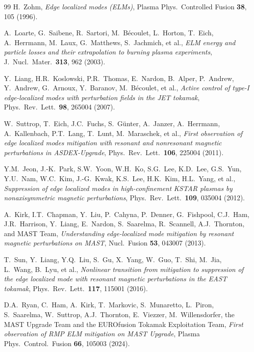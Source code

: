 \documentclass[12pt,prb,aps]{revtex4-1}
\begin{document}
\begin{thebibliography}{99}
 H.~Zohm, {\em Edge localized modes (ELMs)}, Plasma Phys.\ Controlled Fusion {\bf 38}, 105 (1996).

 A.~Loarte, G.~Saibene, R.~Sartori, M.~B\'{e}coulet, L.~Horton, T.~Eich, 
A.~Herrmann, M.~Laux, G.~Matthews, S.~Jachmich, et al., {\em ELM energy and particle losses and their extrapolation to burning plasma experiments}, J.\ Nucl.\ Mater.\ {\bf 313}, 962 (2003).

 Y.~Liang, H.R.~Koslowski, P.R.~Thomas, E.~Nardon, B.~Alper, P.~Andrew, 
Y.~Andrew, G.~Arnoux, Y.~Baranov, M.~B\'{e}coulet, et al., {\em Active control of type-I edge-localized modes with perturbation fields in the JET  tokamak}, Phys.\ Rev.\ Lett.\ {\bf 98}, 265004 (2007).

 W.~Suttrop, T.~Eich, J.C.~Fuchs, S.~G\"{u}nter, A.~Janzer, A.~Herrmann, 
A.~Kallenbach, P.T.~Lang, T.~Lunt, M.~Maraschek,  et al., {\em First observation of edge localized modes mitigation with resonant and nonresonant magnetic perturbations in ASDEX-Upgrade}, Phys.\ Rev.\ Lett.\ {\bf 106}, 225004 (2011).

 Y.M.~Jeon, J.-K.~Park, S.W.~Yoon, W.H.~Ko, S.G.~Lee, K.D.~Lee, G.S.~Yun,
Y.U.~Nam, W.C.~Kim, J.-G.~Kwak, K.S.~Lee, H.K.~Kim, H.L.~Yang,  et al., {\em Suppression of edge localized modes in high-confinement KSTAR plasmas by nonaxisymmetric magnetic perturbations}, 
Phys.\ Rev.\ Lett.\ {\bf 109}, 035004 (2012).

 A.~Kirk, I.T.~Chapman, Y.~Liu, P.~Cahyna, P.~Denner, G.~Fishpool, C.J.~Ham,
J.R.~Harrison, Y.~Liang, E.~Nardon, S.~Saarelma, R.~Scannell, A.J.~Thornton,
and MAST Team, {\em Understanding edge-localized mode mitigation by resonant magnetic perturbations on MAST}, Nucl.\ Fusion {\bf 53}, 043007 (2013).

 T.~Sun, Y.~Liang, Y.Q.~Liu, S.~Gu, X.~Yang, W.~Guo, T.~Shi, M.~Jia, L.~Wang, 
B.~Lyu, et al., {\em Nonlinear transition from mitigation to suppression of the edge localized mode with resonant magnetic perturbations in the EAST tokamak}, Phys.\ Rev.\ Lett.\ {\bf 117}, 115001 (2016).

 D.A.~Ryan, C.~Ham, A.~Kirk, T.~Markovic, S.~Munaretto, L.~Piron, S.~Saarelma, W.~Suttrop, A.J.~Thornton, E.~Viezzer, M.~Willensdorfer, the MAST Upgrade Team and the EUROfusion Tokamak Exploitation Team, {\em First observation of RMP ELM mitigation on MAST Upgrade}, Plasma Phys.\ Control.\ Fusion {\bf 66},  105003 (2024).


\end{thebibliography}
\end{document}
